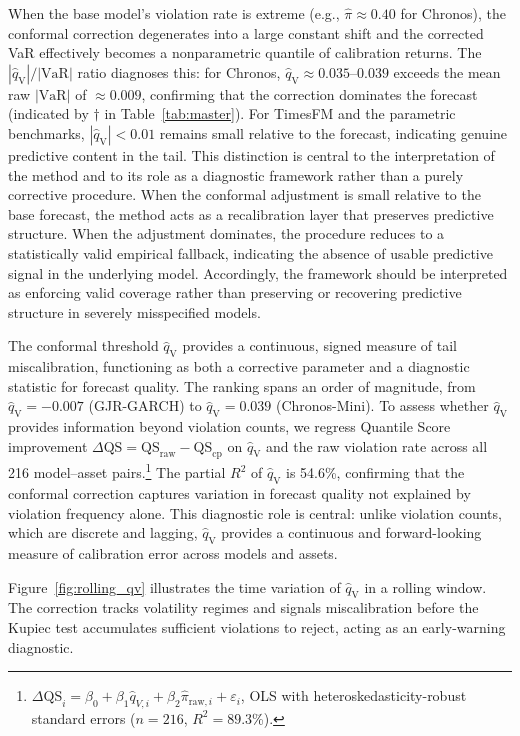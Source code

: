 \documentclass[preprint,11pt,authoryear]{elsarticle}
\newcommand{\VaR}{\mathrm{VaR}}
\newcommand{\1}{\boldsymbol{1}}
\newcommand{\qV}{\hat{q}_{\scriptscriptstyle\mathrm{V}}}
\begin{document}
	When the base model's violation rate is extreme (e.g.,
	$\hat\pi \approx 0.40$ for Chronos), the conformal correction
	degenerates into a large constant shift and the corrected VaR
	effectively becomes a nonparametric quantile of calibration
	returns. The $|\qV|/|\VaR|$ ratio diagnoses this: for
	Chronos, $\qV \approx 0.035$--$0.039$ exceeds the mean raw
	$|\VaR|$ of $\approx 0.009$, confirming that the correction
	dominates the forecast (indicated by $\dagger$ in
	Table~\ref{tab:master}). For TimesFM and the parametric
	benchmarks, $|\qV| < 0.01$ remains small relative to the
	forecast, indicating genuine predictive content in the tail.
	This distinction is central to the interpretation of the method and to its role as a diagnostic framework rather than a purely corrective procedure. When the conformal adjustment is small relative to the base forecast, the method acts as a recalibration layer that preserves predictive structure. When the adjustment dominates, the procedure reduces to a statistically valid empirical fallback, indicating the absence of usable predictive signal in the underlying model.
	Accordingly, the framework should be interpreted as enforcing valid coverage rather than preserving or recovering predictive structure in severely misspecified models.

	The conformal threshold $\qV$ provides a continuous, signed
	measure of tail miscalibration, functioning as both a corrective parameter and a diagnostic statistic for forecast quality. The ranking spans an order of
	magnitude, from $\qV = -0.007$ (GJR-GARCH) to $\qV = 0.039$
	(Chronos-Mini). To assess whether $\qV$ provides information
	beyond violation counts, we regress Quantile Score improvement
	$\Delta\mathrm{QS} = \mathrm{QS}_{\mathrm{raw}} -
	\mathrm{QS}_{\mathrm{cp}}$ on $\qV$ and the raw violation
	rate across all 216 model--asset
	pairs.\footnote{$\Delta\mathrm{QS}_i = \beta_0 + \beta_1
		\hat{q}_{V,i} + \beta_2 \hat\pi_{\mathrm{raw},i} +
		\varepsilon_i$, OLS with heteroskedasticity-robust standard
		errors ($n = 216$, $R^2 = 89.3$\%).} The partial $R^2$ of
	$\qV$ is 54.6\%, confirming that the conformal correction
	captures variation in forecast quality not explained by
	violation frequency alone.
	This diagnostic role is central: unlike violation counts, which are discrete and lagging, $\qV$ provides a continuous and forward-looking measure of calibration error across models and assets.

	Figure~\ref{fig:rolling_qv} illustrates the time variation of
	$\qV$ in a rolling window. The correction tracks volatility
	regimes and signals miscalibration before the Kupiec test
	accumulates sufficient violations to reject, acting as an
	early-warning diagnostic.
	
\end{document}
